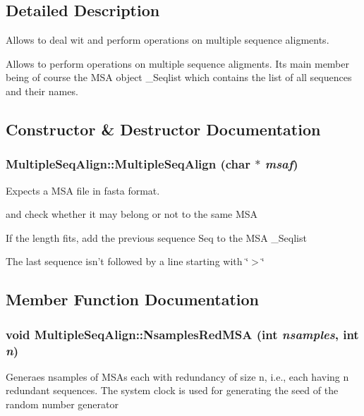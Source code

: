 \subsection{Detailed Description}
Allows to deal wit and perform operations on multiple sequence aligments. 

Allows to perform operations on multiple sequence aligments. Its main member being of course the MSA object \_\-Seqlist which contains the list of all sequences and their names. 



\subsection{Constructor \& Destructor Documentation}
\subsubsection{\setlength{\rightskip}{0pt plus 5cm}Multiple\-Seq\-Align::Multiple\-Seq\-Align (char $\ast$ {\em msaf})}\label{classMultipleSeqAlign_a1}


Expects a MSA file in fasta format. 

and check whether it may belong or not to the same MSA

If the length fits, add the previous sequence Seq to the MSA \_\-Seqlist

The last sequence isn't followed by a line starting with \char`\"{}$>$\char`\"{} 

\subsection{Member Function Documentation}
\subsubsection{\setlength{\rightskip}{0pt plus 5cm}void Multiple\-Seq\-Align::Nsamples\-Red\-MSA (int {\em nsamples}, int {\em n})}\label{classMultipleSeqAlign_a30}


Generaes nsamples of MSAs each with redundancy of size n, i.e., each having n redundant sequences. The system clock is used for generating the seed of the random number generator 
